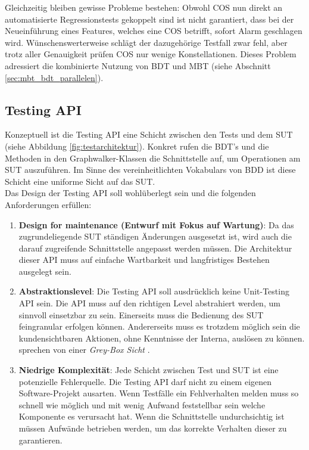 Gleichzeitig bleiben gewisse Probleme bestehen: Obwohl \Gls{COS} nun direkt an automatisierte Regressionstests gekoppelt sind ist nicht garantiert, dass bei der Neueinführung eines Features, welches eine \Gls{COS} betrifft, sofort Alarm geschlagen wird. Wünschenswerterweise schlägt der dazugehörige Testfall zwar fehl, aber trotz aller Genauigkeit prüfen \Gls{COS} nur wenige Konstellationen. Dieses Problem adressiert die kombinierte Nutzung von \Gls{BDT} und \Gls{MBT} (siehe Abschnitt \ref{sec:mbt_bdt_parallelen}).

\subsection{Testing API}
\label{sec:testing_api}

Konzeptuell ist die Testing API eine Schicht zwischen den Tests und dem \Gls{SUT} (siehe Abbildung \ref{fig:testarchitektur}). Konkret rufen die \Gls{BDT}'s und die Methoden in den Graphwalker-Klassen die Schnittstelle auf, um Operationen am \Gls{SUT} auszuführen. Im Sinne des vereinheitlichten Vokabulars von \Gls{BDD} ist diese Schicht eine uniforme Sicht auf das \Gls{SUT}.\\
Das Design der Testing API soll wohlüberlegt sein und die folgenden Anforderungen erfüllen:

\begin{enumerate}
\item \textbf{Design for maintenance (Entwurf mit Fokus auf Wartung)}: Da das zugrundeliegende \Gls{SUT} ständigen Änderungen ausgesetzt ist, wird auch die darauf zugreifende Schnittstelle angepasst werden müssen. Die Architektur dieser API muss auf einfache Wartbarkeit und langfristiges Bestehen ausgelegt sein.
\item \textbf{Abstraktionslevel}: Die Testing API soll ausdrücklich keine Unit-Testing API sein. Die API muss auf den richtigen Level abstrahiert werden, um sinnvoll einsetzbar zu sein. Einerseits muss die Bedienung des \Gls{SUT} feingranular erfolgen können. Andererseits muss es trotzdem möglich sein die kundensichtbaren Aktionen, ohne Kenntnisse der Interna, auslösen zu können. \citeauthor{tyler_black-box_2004} sprechen von einer \textit{Grey-Box Sicht} \cite{tyler_black-box_2004}.
\item \textbf{Niedrige Komplexität}: Jede Schicht zwischen Test und \Gls{SUT} ist eine potenzielle Fehlerquelle. Die Testing API darf nicht zu einem eigenen Software-Projekt ausarten. Wenn Testfälle ein Fehlverhalten melden muss so schnell wie möglich und mit wenig Aufwand feststellbar sein welche Komponente es verursacht hat. Wenn die Schnittstelle undurchsichtig ist müssen Aufwände betrieben werden, um das korrekte Verhalten dieser zu garantieren.
\end{enumerate}

